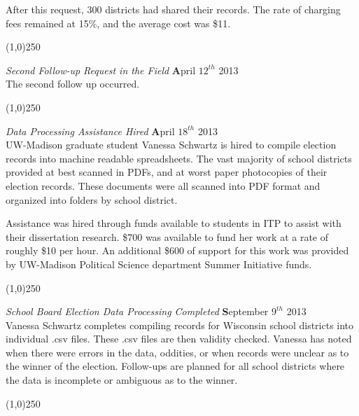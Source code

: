 After this request, 300 districts had shared their records. The rate of charging fees 
remained at 15\%, and the average cost was \$11. 

\begin{center}
\line(1,0){250}
\end{center}

{\em Second Follow-up Request in the Field} \hfill {\textbf April $12^{th}$ 2013}\\

The second follow up occurred. 


\begin{center}
\line(1,0){250}
\end{center}

{\em Data Processing Assistance Hired} \hfill {\textbf April $18^{th}$ 2013}\\

UW-Madison graduate student Vanessa Schwartz is hired to compile election records 
into machine readable spreadsheets. The vast majority of school districts provided 
at best scanned in PDFs, and at worst paper photocopies of their election records. 
These documents were all scanned into PDF format and organized into folders by school 
district. 

Assistance was hired through funds available to students in ITP to assist with their 
dissertation research. \$700 was available to fund her work at a rate of roughly \$10 per 
hour. An additional \$600 of support for this work was provided by UW-Madison Political Science 
department Summer Initiative funds. 



\begin{center}
\line(1,0){250}
\end{center}

{\em School Board Election Data Processing Completed} \hfill {\textbf September $9^{th}$ 2013}\\

Vanessa Schwartz completes compiling records for Wisconsin school districts into 
individual .csv files. These .csv files are then validity checked. Vanessa has 
noted when there were errors in the data, oddities, or when records were unclear 
as to the winner of the election. Follow-ups are planned for all school districts 
where the data is incomplete or ambiguous as to the winner. 

\begin{center}
\line(1,0){250}
\end{center}

